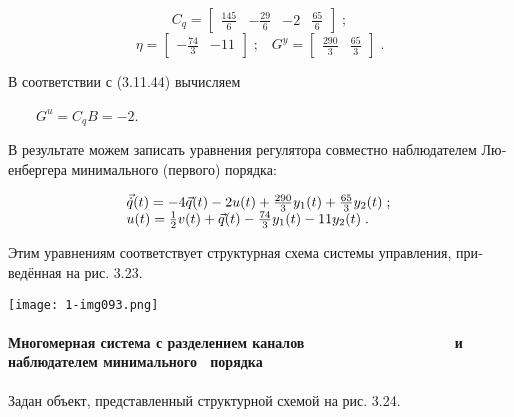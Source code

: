 \documentclass[a4paper]{article}
\begin{document}
\begin{equation*}
C_q=\left[\begin{matrix}\frac{145} 6&-\frac{29} 6&-2&\frac{65} 6\end{matrix}\right]\;;
\end{equation*}
\begin{equation*}
η=\left[\begin{matrix}-\frac{74} 3&-11\end{matrix}\right]\;;\;\;\;G^y=\left[\begin{matrix}\frac{290} 3&\frac{65}
3\end{matrix}\right]\;.
\end{equation*}
{\begin{russian}\sffamily
В соответствии с (3.11.44) вычисляем 
\end{russian}}

{\begin{russian}\sffamily
\ \ \ \  $G^u=C_qB=-2$.
\end{russian}}

{\begin{russian}\sffamily
В результате можем записать уравнения регулятора совместно наблюдателем Люенбергера минимального (первого) порядка:
\end{russian}}

\begin{equation*}
\begin{matrix}\vec{\dot q}(t)=-4\vec q(t)-2u(t)+\frac{290} 3y_1(t)+\frac{65} 3y_2(t)\;;\hfill\null \\u(t)=\frac 1
2v(t)+\vec q(t)-\frac{74} 3y_1(t)-11y_2(t)\;.\hfill\null \end{matrix}\hfill 
\end{equation*}
{\begin{russian}\sffamily
Этим уравнениям соответствует структурная схема системы управления, приведённая на рис. 3.23.
\end{russian}}

{\centering  \texttt{[image: 1-img093.png]} \par}

\bigskip

\paragraph[Многомерная система с разделением каналов \ \ \ \ \ \ \ \ \ \ \ \ \ \ \ \ \ \ и наблюдателем минимального
\ порядка]{Многомерная система с разделением каналов \ \ \ \ \ \ \ \ \ \ \ \ \ \ \ \ \ \ и наблюдателем минимального
\ порядка}
{\begin{russian}\sffamily
Задан объект, представленный структурной схемой на рис. 3.24.
\end{russian}}
\end{document}
